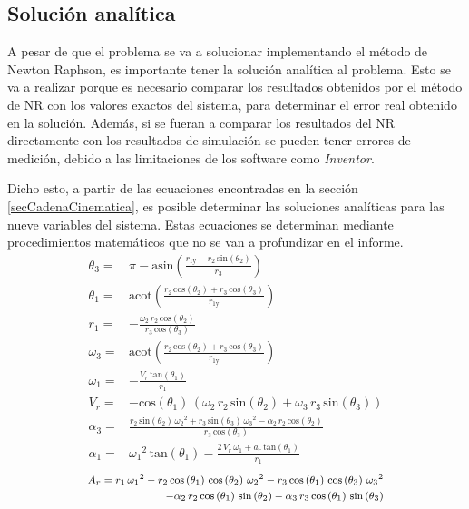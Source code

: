 \documentclass[12pt]{article}
\begin{document}
\subsection{Solución analítica}\label{solAna}
A pesar de que el problema se va a solucionar implementando el método de Newton Raphson, es importante tener la solución analítica al problema.
Esto se va a realizar porque es necesario comparar los resultados obtenidos por el método de NR con los valores exactos del sistema, para determinar el error real obtenido en la solución. Además, si se fueran a comparar los resultados del NR directamente con los resultados de simulación se pueden tener errores de medición, debido a las limitaciones de los software como \textit{Inventor}.

Dicho esto, a partir de las ecuaciones encontradas en la sección \ref{secCadenaCinematica}, es posible determinar las soluciones analíticas para las nueve variables del sistema. Estas ecuaciones se determinan mediante procedimientos matemáticos que no se van a profundizar en el informe. 
\footnotesize
\begin{align}
    \theta_3=&\pi -\mathrm{asin}\left(\frac{r_{\textrm{1y}} -r_2 \,\mathrm{sin}\left(\theta_2 \right)}{r_3 }\right)\\
    \theta_1=&\mathrm{acot}\left(\frac{r_2 \,\mathrm{cos}\left(\theta_2 \right)+r_3 \,\mathrm{cos}\left(\theta_3 \right)}{r_{\textrm{1y}} }\right)\\
    r_1=&-\frac{\omega_2 \,r_2 \,\mathrm{cos}\left(\theta_2 \right)}{r_3 \,\mathrm{cos}\left(\theta_3 \right)}\\
    \omega_3=&\mathrm{acot}\left(\frac{r_2 \,\mathrm{cos}\left(\theta_2 \right)+r_3 \,\mathrm{cos}\left(\theta_3 \right)}{r_{\textrm{1y}} }\right)\\
    \omega_1=&-\frac{V_r \,\mathrm{tan}\left(\theta_1 \right)}{r_1 }\\
    V_r=&-\mathrm{cos}\left(\theta_1 \right)\,{\left(\omega_2 \,r_2 \,\mathrm{sin}\left(\theta_2 \right)+\omega_3 \,r_3 \,\mathrm{sin}\left(\theta_3 \right)\right)}\\
    \alpha_3=&\frac{r_2 \,\mathrm{sin}\left(\theta_2 \right)\,{\omega_2 }^2 +r_3 \,\mathrm{sin}\left(\theta_3 \right)\,{\omega_3 }^2 -\alpha_2 \,r_2 \,\mathrm{cos}\left(\theta_2 \right)}{r_3 \,\mathrm{cos}\left(\theta_3 \right)}\\
    \alpha_1=&{\omega_1 }^2 \,\mathrm{tan}\left(\theta_1 \right)-\frac{2\,V_r \,\omega_1 +a_r \,\mathrm{tan}\left(\theta_1 \right)}{r_1 }
\end{align}
\begin{equation}
\footnotesize
    \begin{split}
    A_r=r_1 \,{\omega_1 }^2 -r_2 \,\mathrm{cos}\left(\theta_1 \right)\,\mathrm{cos}\left(\theta_2 \right)\,{\omega_2 }^2 -r_3 \,\mathrm{cos}\left(\theta_1 \right)\,\mathrm{cos}\left(\theta_3 \right)\,{\omega_3 }^2\\ -\alpha_2 \,r_2 \,\mathrm{cos}\left(\theta_1 \right)\,\mathrm{sin}\left(\theta_2 \right)-\alpha_3 \,r_3 \,\mathrm{cos}\left(\theta_1 \right)\,\mathrm{sin}\left(\theta_3 \right)    
\end{split}
\end{equation}
\normalsize
\end{document}
